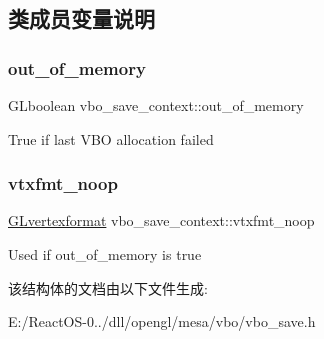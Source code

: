 \subsection{类成员变量说明}
\mbox{\label{structvbo__save__context_ab57d574dd52495859511714c6fdc9ff2}} 
\subsubsection{\texorpdfstring{out\+\_\+of\+\_\+memory}{out\_of\_memory}}
{\footnotesize\ttfamily G\+Lboolean vbo\+\_\+save\+\_\+context\+::out\+\_\+of\+\_\+memory}

True if last V\+BO allocation failed \mbox{\label{structvbo__save__context_a70fb11090704a281aa91f0ddec9b86e2}} 
\subsubsection{\texorpdfstring{vtxfmt\+\_\+noop}{vtxfmt\_noop}}
{\footnotesize\ttfamily \hyperlink{struct_g_lvertexformat}{G\+Lvertexformat} vbo\+\_\+save\+\_\+context\+::vtxfmt\+\_\+noop}

Used if out\+\_\+of\+\_\+memory is true 

该结构体的文档由以下文件生成\+:\begin{DoxyCompactItemize}
\item 
E\+:/\+React\+O\+S-\/0../dll/opengl/mesa/vbo/vbo\+\_\+save.\+h\end{DoxyCompactItemize}
